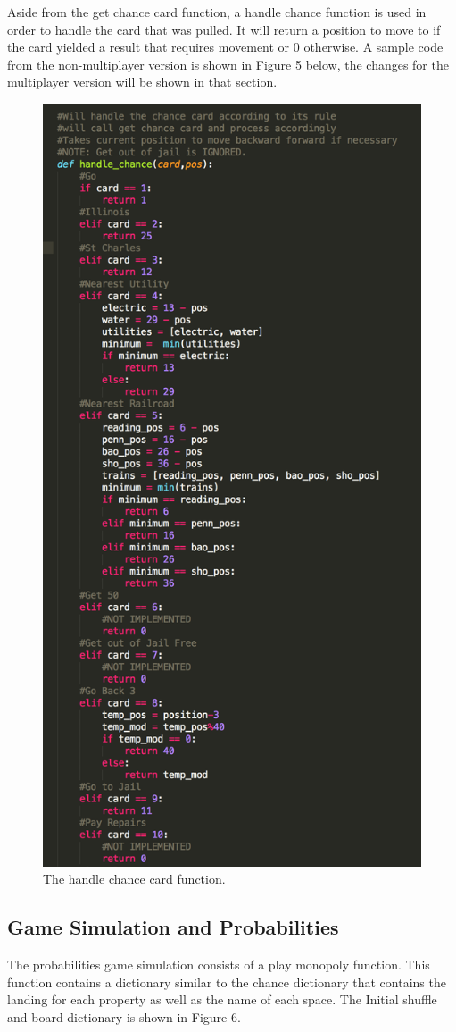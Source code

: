 \documentclass[12pt, letter]{article}
\begin{document}
\FloatBarrier

Aside from the get chance card function, a handle chance function is used in order to handle the card that was pulled. It will return a position to move to if the card yielded a result that requires movement or 0 otherwise. A sample code from the non-multiplayer version is shown in Figure 5 below, the changes for the multiplayer version will be shown in that section.

 \begin{figure}[htb]
  \centering
  \includegraphics[width=0.6 \textwidth]{./figures/handle_chance.png}
  \caption{The handle chance card function.}
\end{figure}

\FloatBarrier

\subsection{Game Simulation and Probabilities}

The probabilities game simulation consists of a play monopoly function. This function contains a dictionary similar to the chance dictionary that contains the landing for each property as well as the name of each space. The Initial shuffle and board dictionary is shown in Figure 6.
\end{document}
